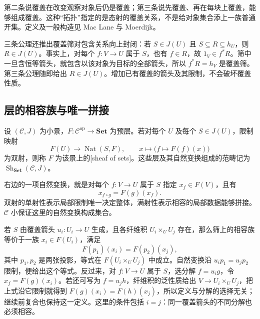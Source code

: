 第二条说覆盖在改变观察对象后仍是覆盖；第三条说先覆盖、再在每块上覆盖，能够组成覆盖。这种“拓扑”指定的是态射的覆盖关系，不是给对象集合添上一族普通开集。定义及一般构造见 Mac Lane 与 Moerdijk\cite[Chapter III, Sections 1--2]{MacLaneMoerdijk1992Sheaves}。

\ProseParagraphBreak
三条公理还推出覆盖筛对包含关系向上封闭：若 \(S\in J(U)\) 且 \(S\subseteq R\subseteq h_U\)，则 \(R\in J(U)\)。事实上，对每个 \(f:V\to U\) 属于 \(S\)，也有 \(f\in R\)，故 \(1_V\in f^*R\)。筛中一旦含恒等箭头，就包含以该对象为目标的全部箭头，所以 \(f^*R=h_V\) 是覆盖筛。第三条公理随即给出 \(R\in J(U)\)。增加已有覆盖的箭头及其限制，不会破坏覆盖性质。

\subsection{层的相容族与唯一拼接}
\label{b4:subsec:E01:02}

\begin{definition}\label{b4:def:site-set-sheaf}
	设 \((\mathcal C,J)\) 为小景，\(F:\mathcal C^{\mathrm{op}}\to\mathbf{Set}\) 为预层。若对每个 \(U\) 及每个 \(S\in J(U)\)，限制映射
	\[
		F(U)\longrightarrow\operatorname{Nat}(S,F),\qquad x\longmapsto\bigl(f\longmapsto F(f)(x)\bigr)
	\]
	为双射，则称 \(F\) 为该景上的[sheaf of sets]。这些层及其自然变换组成的范畴记为 \(\operatorname{Sh}_{\mathbf{Set}}(\mathcal C,J)\)。
\end{definition}

右边的一项自然变换，就是对每个 \(f:V\to U\) 属于 \(S\) 指定 \(x_f\in F(V)\)，且有
\[
	x_{f\circ g}=F(g)(x_f).
\]
双射的单射性表示局部限制唯一决定整体，满射性表示相容的局部数据能够拼接。\(\mathcal C\) 小保证这里的自然变换构成集合。

\ProseParagraphBreak
若 \(S\) 由覆盖箭头 \(u_i:U_i\to U\) 生成，且各纤维积 \(U_i\times_UU_j\) 存在，那么筛上的相容族等价于一族 \(x_i\in F(U_i)\)，满足
\[
	F(p_1)(x_i)=F(p_2)(x_j),
\]
其中 \(p_1,p_2\) 是两张投影，等式在 \(F(U_i\times_UU_j)\) 中成立。自然变换沿 \(u_ip_1=u_jp_2\) 限制，便给出这个等式。反过来，对 \(f:V\to U\) 属于 \(S\)，选分解 \(f=u_i g\)，令 \(x_f=F(g)(x_i)\)。若还可写为 \(f=u_j h\)，纤维积的泛性质给出 \(V\to U_i\times_UU_j\)，把上式沿它限制就得到 \(F(g)(x_i)=F(h)(x_j)\)，所以定义与分解的选择无关；继续前复合也保持这一定义。这里的条件包括 \(i=j\)：同一覆盖箭头的不同分解也必须相容。

